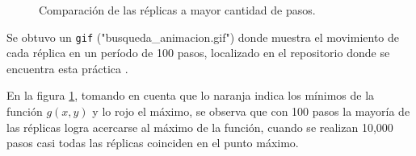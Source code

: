 \documentclass{article}
\begin{document}
\begin{figure}[h!]
 \centering
 \caption{Comparaci\'on de las r\'eplicas a mayor cantidad de pasos.}
 \label{fig:comparacion}
\end{figure}

Se obtuvo un \texttt{gif} ("busqueda\_animacion.gif") donde muestra el movimiento de cada r\'eplica en un per\'iodo de 100 pasos, localizado en el repositorio donde se encuentra esta pr\'actica \cite{repo}.

En la figura \ref{fig:comparacion}, tomando en cuenta que lo naranja indica los m\'inimos de la funci\'on $g(x,y)$ y lo rojo el m\'aximo, se observa que con 100 pasos la mayor\'ia de las r\'eplicas logra acercarse al m\'aximo de la funci\'on, cuando se realizan 10,000 pasos casi todas las r\'eplicas coinciden en el punto m\'aximo.

\newpage



\end{document}
